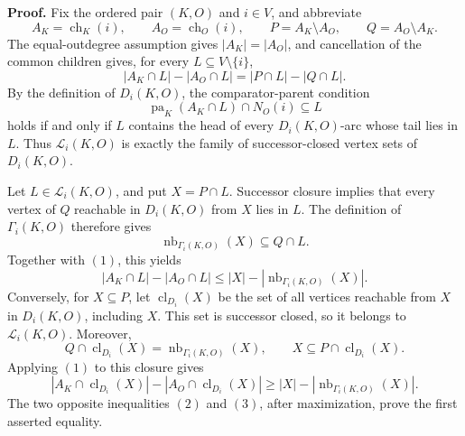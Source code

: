 \textbf{Proof.}
Fix the ordered pair \((K,O)\) and \(i\in V\), and abbreviate
\[
 A_K=\operatorname{ch}_K(i),\qquad
 A_O=\operatorname{ch}_O(i),\qquad
 P=A_K\setminus A_O,\qquad Q=A_O\setminus A_K.
\]
The equal-outdegree assumption gives \(|A_K|=|A_O|\), and cancellation of the common children gives, for every \(L\subseteq V\setminus\{i\}\),
\[
 |A_K\cap L|-|A_O\cap L|=|P\cap L|-|Q\cap L|.
 \tag{1}
\]
By the definition of \(D_i(K,O)\), the comparator-parent condition
\[
 \operatorname{pa}_K(A_K\cap L)\cap N_O(i)\subseteq L
\]
holds if and only if \(L\) contains the head of every \(D_i(K,O)\)-arc whose tail lies in \(L\).  Thus \(\mathcal L_i(K,O)\) is exactly the family of successor-closed vertex sets of \(D_i(K,O)\).

Let \(L\in\mathcal L_i(K,O)\), and put \(X=P\cap L\).  Successor closure implies that every vertex of \(Q\) reachable in \(D_i(K,O)\) from \(X\) lies in \(L\).  The definition of \(\Gamma_i(K,O)\) therefore gives
\[
 \operatorname{nb}_{\Gamma_i(K,O)}(X)\subseteq Q\cap L.
\]
Together with \((1)\), this yields
\[
 |A_K\cap L|-|A_O\cap L|
 \le |X|-|\operatorname{nb}_{\Gamma_i(K,O)}(X)|.
 \tag{2}
\]
Conversely, for \(X\subseteq P\), let \(\operatorname{cl}_{D_i}(X)\) be the set of all vertices reachable from \(X\) in \(D_i(K,O)\), including \(X\).  This set is successor closed, so it belongs to \(\mathcal L_i(K,O)\).  Moreover,
\[
 Q\cap\operatorname{cl}_{D_i}(X)
 =\operatorname{nb}_{\Gamma_i(K,O)}(X),
 \qquad
 X\subseteq P\cap\operatorname{cl}_{D_i}(X).
\]
Applying \((1)\) to this closure gives
\[
 |A_K\cap\operatorname{cl}_{D_i}(X)|
 -|A_O\cap\operatorname{cl}_{D_i}(X)|
 \ge |X|-|\operatorname{nb}_{\Gamma_i(K,O)}(X)|.
 \tag{3}
\]
The two opposite inequalities \((2)\) and \((3)\), after maximization, prove the first asserted equality.

